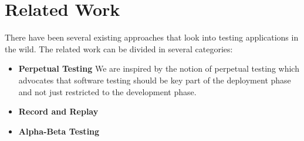 
\section{Related Work}
\label{sec:related}

There have been several existing approaches that look into testing applications in the wild. 
The related work can be divided in several categories:

\begin{itemize}
  \item \textbf{Perpetual Testing}
    We are inspired by the notion of perpetual testing\cite{perpetual} which advocates that software testing should be key part of the deployment phase and not just restricted to the development phase.
  \item \textbf{Record and Replay}
  \item \textbf{Alpha-Beta Testing}  
\end{itemize}
  

